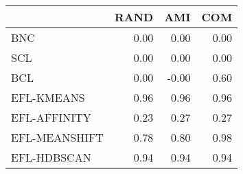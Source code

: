 \begin{tabular}{lrrr}
\toprule
 & RAND & AMI & COM \\
\midrule
BNC & 0.00 & 0.00 & 0.00 \\
SCL & 0.00 & 0.00 & 0.00 \\
BCL & 0.00 & -0.00 & 0.60 \\
EFL-KMEANS & 0.96 & 0.96 & 0.96 \\
EFL-AFFINITY & 0.23 & 0.27 & 0.27 \\
EFL-MEANSHIFT & 0.78 & 0.80 & 0.98 \\
EFL-HDBSCAN & 0.94 & 0.94 & 0.94 \\
\bottomrule
\end{tabular}
